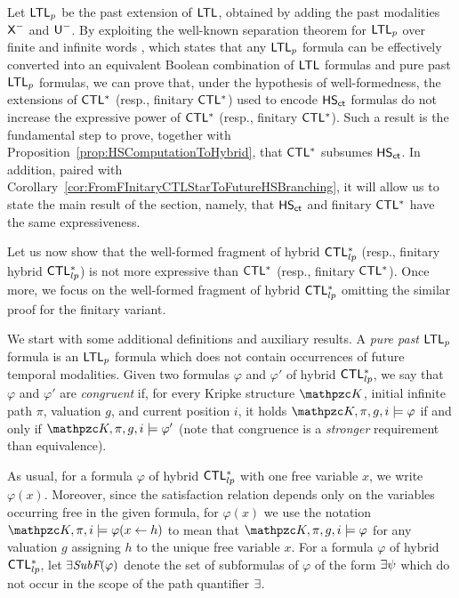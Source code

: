 Let $\text{\sffamily LTL$_p$}$ be the past extension of $\text{\sffamily LTL}$, obtained by adding the past modalities $\textsf{X}^{-}$ and $\textsf{U}^{-}$.
By exploiting the well-known separation theorem for $\text{\sffamily LTL$_p$}$ over finite and infinite words \cite{Gabbay87}, which states that any $\text{\sffamily LTL$_p$}$ formula can be effectively converted into an equivalent Boolean combination of $\text{\sffamily LTL}$ formulas and pure past $\text{\sffamily LTL$_p$}$ formulas, we can prove that, under the hypothesis of well-formedness, the extensions of $\text{\sffamily CTL$^{*}$}$ (resp., finitary $\text{\sffamily CTL$^{*}$}$) used to encode  $\text{\sffamily HS}_{\mathsf{ct}}$ formulas do not increase the expressive power of $\text{\sffamily CTL$^{*}$}$ (resp., finitary $\text{\sffamily CTL$^{*}$}$). Such a result is the fundamental step to prove, together with Proposition~\ref{prop:HSComputationToHybrid},
that $\text{\sffamily CTL$^{*}$}$ subsumes $\text{\sffamily HS}_{\mathsf{ct}}$. In addition, paired with Corollary~\ref{cor:FromFInitaryCTLStarToFutureHSBranching}, it will allow us to state the main result of the section, namely, that $\text{\sffamily HS}_{\mathsf{ct}}$ and finitary $\text{\sffamily CTL$^{*}$}$ have the same expressiveness.

Let us now show that the well-formed fragment of hybrid $\text{\sffamily CTL$^{*}_{lp}$}$ (resp., finitary hybrid $\text{\sffamily CTL$^{*}_{lp}$}$) is not more expressive than $\text{\sffamily CTL$^{*}$}$ (resp., finitary $\text{\sffamily CTL$^{*}$}$). Once more, we focus on the well-formed fragment of hybrid $\text{\sffamily CTL$^{*}_{lp}$}$ omitting the similar proof for the finitary variant.

We start with some additional definitions and auxiliary results.  A \emph{pure past} $\text{\sffamily LTL$_p$}$ formula is an $\text{\sffamily LTL$_p$}$ formula which does not contain occurrences of future temporal modalities. Given two formulas $\varphi$ and $\varphi'$ of hybrid $\text{\sffamily CTL$^{*}_{lp}$}$, we say that
$\varphi$ and $\varphi'$ are \emph{congruent} if, for every  Kripke structure $\Ku$, initial infinite path $\pi$, valuation $g$, and current position $i$, it holds
$\Ku,\pi,g, i \models \varphi$ if and only if $\Ku,\pi,g, i \models \varphi'$ (note that congruence is a \emph{stronger} requirement than equivalence).

As usual, for a formula $\varphi$ of hybrid $\text{\sffamily CTL$^{*}_{lp}$}$ with one free variable $x$, we write $\varphi(x)$. Moreover, since the satisfaction relation depends only on the variables occurring free in the given formula, for $\varphi(x)$ we  use the notation
$\Ku,\pi,i \models \varphi(x \leftarrow h)$ to mean that $\Ku,\pi,g,i \models \varphi$ for any valuation $g$ assigning $h$ to the unique free variable $x$.
For a formula $\varphi$ of hybrid $\text{\sffamily CTL$^{*}_{lp}$}$, let $\exists\textit{SubF}(\varphi)$ denote the set of subformulas of $\varphi$ of the form $\exists \psi$ which do not occur in the scope of
the path quantifier $\exists$.

